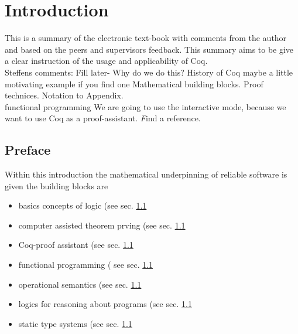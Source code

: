 \section{Introduction}


This is a summary of the electronic text-book \cite{PACGGHSY} with comments from the author and based on the peers and supervisors feedback.
This summary aims to be give a clear instruction of the usage and applicability of Coq.\\

    
Steffens comments:
Fill later-
 Why do we do this?
 History of Coq
 maybe a little motivating example if you find one
 Mathematical building blocks. Proof technices. Notation to Appendix.\\
 \gls{functional programming}
We are going to use the interactive mode, because we want to use Coq as a proof-assistant. {\emph Find a reference.}
\subsection{Preface}
Within this introduction the mathematical underpinning of reliable software is given the building blocks are
\begin{itemize}
\item basics concepts of logic (see sec. \ref{} %
\item computer assisted theorem prving (see sec. \ref{} %
\item Coq-proof assistant (see sec. \ref{} %
\item functional programming ( see sec. \ref{} %
\item operational semantics (see sec. \ref{} %
\item logics for reasoning about programs (see sec. \ref{} %
\item static type systems (see sec. \ref{} %
\end{itemize} 

